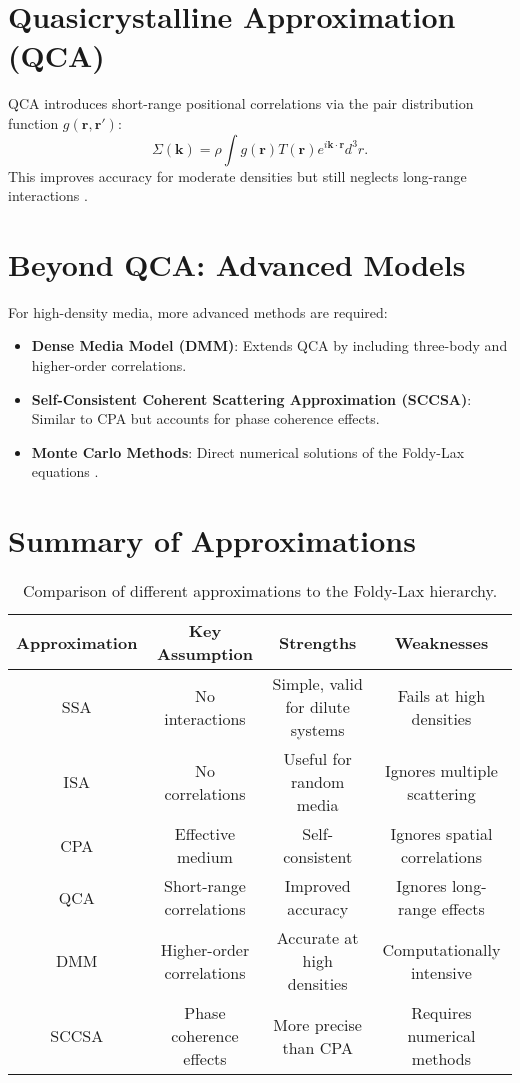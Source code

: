 \documentclass{article}
\begin{document}
	\section{Quasicrystalline Approximation (QCA)}
	QCA introduces short-range positional correlations via the pair distribution function \( g(\mathbf{r}, \mathbf{r'}) \):
	\begin{equation}
		\Sigma(\mathbf{k}) = \rho \int g(\mathbf{r}) T(\mathbf{r}) e^{i \mathbf{k} \cdot \mathbf{r}} d^3r.
	\end{equation}
	This improves accuracy for moderate densities but still neglects long-range interactions \cite{barrera1989coherent}.
	
	\section{Beyond QCA: Advanced Models}
	For high-density media, more advanced methods are required:
	\begin{itemize}
		\item \textbf{Dense Media Model (DMM)}: Extends QCA by including three-body and higher-order correlations.
		\item \textbf{Self-Consistent Coherent Scattering Approximation (SCCSA)}: Similar to CPA but accounts for phase coherence effects.
		\item \textbf{Monte Carlo Methods}: Direct numerical solutions of the Foldy-Lax equations \cite{lagendijk1996resonant}.
	\end{itemize}
	
	\section{Summary of Approximations}
	\begin{table}[h!]
		\centering
		\begin{tabular}{|c|c|c|c|}
			\hline
			\textbf{Approximation} & \textbf{Key Assumption} & \textbf{Strengths} & \textbf{Weaknesses} \\
			\hline
			SSA & No interactions & Simple, valid for dilute systems & Fails at high densities \\
			ISA & No correlations & Useful for random media & Ignores multiple scattering \\
			CPA & Effective medium & Self-consistent & Ignores spatial correlations \\
			QCA & Short-range correlations & Improved accuracy & Ignores long-range effects \\
			DMM & Higher-order correlations & Accurate at high densities & Computationally intensive \\
			SCCSA & Phase coherence effects & More precise than CPA & Requires numerical methods \\
			\hline
		\end{tabular}
		\caption{Comparison of different approximations to the Foldy-Lax hierarchy.}
	\end{table}
	
\end{document}
